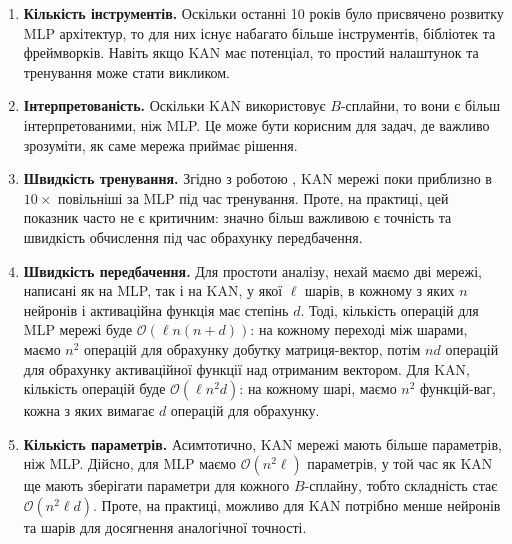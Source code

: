 \begin{enumerate}
	\item \textbf{Кількість інструментів.} Оскільки останні 10 років було
	присвячено розвитку MLP архітектур, то для них існує набагато більше
	інструментів, бібліотек та фреймворків. Навіть якщо KAN має потенціал, то
	простий налаштунок та тренування може стати викликом.
	\item \textbf{Інтерпретованість.} Оскільки KAN використовує $B$-сплайни, то
	вони є більш інтерпретованими, ніж MLP. Це може бути корисним для задач, де
	важливо зрозуміти, як саме мережа приймає рішення.
	\item \textbf{Швидкість тренування.} Згідно з роботою \cite{kan}, KAN мережі
	поки приблизно в $10\times$ повільніші за MLP під час тренування. Проте,
	на практиці, цей показник часто не є критичним: значно більш важливою є
	точність та швидкість обчислення під час обрахунку передбачення.
	\item \textbf{Швидкість передбачення.} Для простоти аналізу, нехай маємо дві
	мережі, написані як на MLP, так і на KAN, у якої $\ell$ шарів, в кожному з
	яких $n$ нейронів і активаційна функція має степінь $d$. Тоді, кількість
	операцій для MLP мережі буде $\mathcal{O}(\ell n(n+d))$: на кожному переході
	між шарами, маємо $n^2$ операцій для обрахунку добутку матриця-вектор, потім
	$nd$ операцій для обрахунку активаційної функції над отриманим вектором. Для
	KAN, кількість операцій буде $\mathcal{O}(\ell n^2 d)$: на кожному шарі,
	маємо $n^2$ функцій-ваг, кожна з яких вимагає $d$ операцій для обрахунку.
	\item \textbf{Кількість параметрів.} Асимтотично, KAN мережі мають більше
	параметрів, ніж MLP. Дійсно, для MLP маємо $\mathcal{O}(n^2\ell)$ параметрів,
	у той час як KAN ще мають зберігати параметри для кожного $B$-сплайну, тобто 
	складність стає $\mathcal{O}(n^2\ell d)$. Проте, на практиці, можливо для KAN 
	потрібно менше нейронів та шарів для досягнення аналогічної точності.
\end{enumerate}